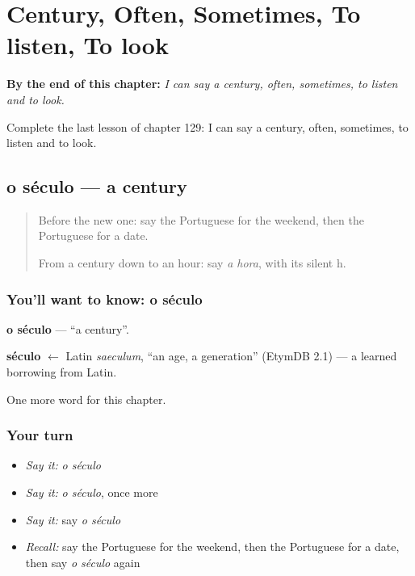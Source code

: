 
\chapter{Century, Often, Sometimes, To listen, To look}
\label{ch:pt-century-often-sometimes-to-listen-to-look}

\begin{chapteropening}
\textbf{By the end of this chapter:} \emph{I can say a century, often, sometimes, to listen and to look.}

Complete the last lesson of chapter 129: I can say a century, often, sometimes, to listen and to look.
\end{chapteropening}

\section[o século]{o século — a century}

\label{lesson:PT-C129-seculo}



\begin{quote}
Before the new one: say the Portuguese for the weekend, then the Portuguese for a date.

From a century down to an hour: say \emph{a hora}, with its silent h.
\end{quote}

\subsection*{You'll want to know: o século}
\textbf{o século} — \textquotedblleft{}a century\textquotedblright{}.

\begin{cousinweb}
\textbf{século} $\leftarrow$ Latin \emph{saeculum}, \textquotedblleft{}an age, a generation\textquotedblright{} (EtymDB 2.1) — a learned borrowing from Latin.
\end{cousinweb}

\begin{grammarlens}[title={What you've built}]
One more word for this chapter.
\end{grammarlens}

\subsection*{Your turn}
\begin{itemize}
\raggedright
  \item \emph{Say it:} \emph{o século}
  \item \emph{Say it:} \emph{o século}, once more
  \item \emph{Say it:} say \emph{o século}
  \item \emph{Recall:} say the Portuguese for the weekend, then the Portuguese for a date, then say \emph{o século} again
\end{itemize}

